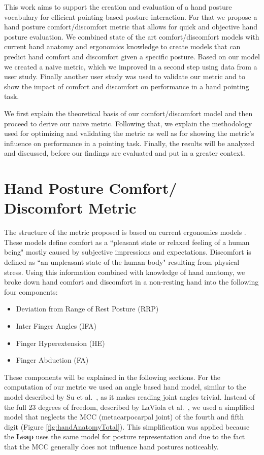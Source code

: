 \documentclass{sig-alternate-05-2015}
\begin{document}
This work aims to support the creation and evaluation of a hand posture vocabulary for efficient pointing-based posture interaction. For that we propose a hand posture comfort/discomfort metric that allows for quick and objective hand posture evaluation. We combined state of the art comfort/discomfort models with current hand anatomy and ergonomics knowledge to create models that can predict hand comfort and discomfort given a specific posture. Based on our model we created a naive metric, which we improved in a second step using data from a user study. Finally another user study was used to validate our metric and to show the impact of comfort and discomfort on performance in a hand pointing task.

We first explain the theoretical basis of our comfort/discomfort model and then proceed to derive our naive metric. Following that, we explain the methodology used for optimizing and validating the metric as well as for showing the metric's influence on performance in a pointing task. Finally, the results will be analyzed and discussed, before our findings are evaluated and put in a greater context.


\section{Hand Posture Comfort/ Discomfort Metric}
The structure of the metric proposed is based on current ergonomics models \cite{vink2012editorial}. These models define comfort as a ``pleasant state or relaxed feeling of a human being" mostly caused by subjective impressions and expectations. Discomfort is defined as ``an unpleasant state of the human body" resulting from physical stress. Using this information combined with knowledge of hand anatomy, we broke down hand comfort and discomfort in a non-resting hand into the following four components: 

\begin{itemize}
	\item Deviation from Range of Rest Posture (RRP)
	\item Inter Finger Angles (IFA)
	\item Finger Hyperextension (HE)
	\item Finger Abduction (FA)
\end{itemize}

These components will be explained in the following sections. For the computation of our metric we used an angle based hand model, similar to the model described by Su et al.~\cite{su1994logical}, as it makes reading joint angles trivial. Instead of the full 23 degrees of freedom, described by LaViola et al.~\cite{laviola1999survey}, we used a simplified model that neglects the MCC (metacarpocarpal joint) of the fourth and fifth digit (Figure \ref{fig:handAnatomyTotal}). This simplification was applied because the \textbf{Leap} uses the same model for posture representation and due to the fact that the MCC generally does not influence hand postures noticeably.
\end{document}
